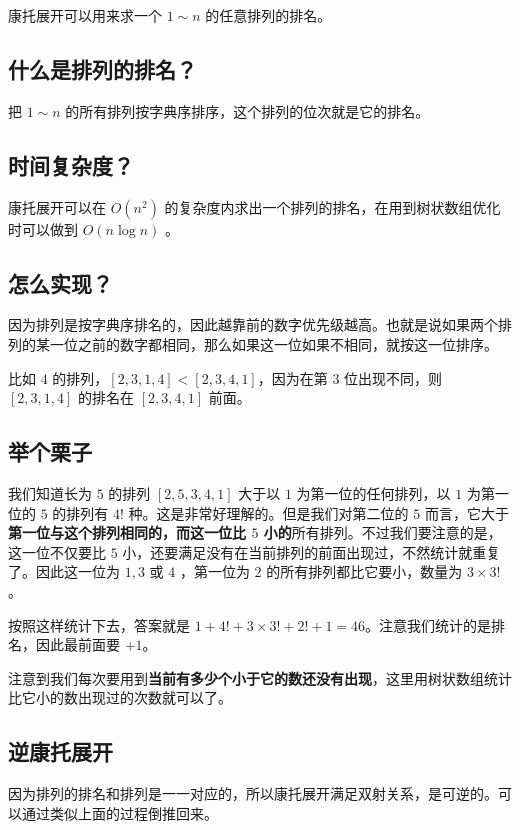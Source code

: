 
康托展开可以用来求一个 $1\sim n$ 的任意排列的排名。

\subsection{什么是排列的排名？}

把 $1\sim n$ 的所有排列按字典序排序，这个排列的位次就是它的排名。

\subsection{时间复杂度？}

康托展开可以在 $O(n^2)$ 的复杂度内求出一个排列的排名，在用到树状数组优化时可以做到 $O(n\log n)$ 。

\subsection{怎么实现？}

因为排列是按字典序排名的，因此越靠前的数字优先级越高。也就是说如果两个排列的某一位之前的数字都相同，那么如果这一位如果不相同，就按这一位排序。

比如 $4$ 的排列，$[2,3,1,4]<[2,3,4,1]$，因为在第 $3$ 位出现不同，则 $[2,3,1,4]$ 的排名在 $[2,3,4,1]$ 前面。

\subsection{举个栗子}

我们知道长为 $5$ 的排列 $[2,5,3,4,1]$ 大于以 $1$ 为第一位的任何排列，以 $1$ 为第一位的 $5$ 的排列有 $4!$ 种。这是非常好理解的。但是我们对第二位的 $5$ 而言，它大于\textbf{第一位与这个排列相同的，而这一位比 $5$ 小的}所有排列。不过我们要注意的是，这一位不仅要比 $5$ 小，还要满足没有在当前排列的前面出现过，不然统计就重复了。因此这一位为 $1,3$ 或 $4$ ，第一位为 $2$ 的所有排列都比它要小，数量为 $3\times 3!$。

按照这样统计下去，答案就是 $1+4!+3\times 3!+2!+1=46$。注意我们统计的是排名，因此最前面要 $+1$。

注意到我们每次要用到\textbf{当前有多少个小于它的数还没有出现}，这里用树状数组统计比它小的数出现过的次数就可以了。

\subsection{逆康托展开}

因为排列的排名和排列是一一对应的，所以康托展开满足双射关系，是可逆的。可以通过类似上面的过程倒推回来。

